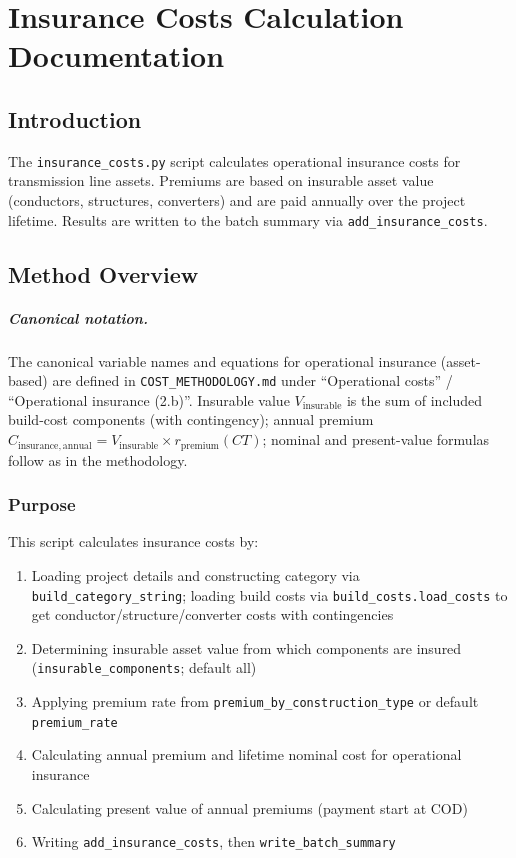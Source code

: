 \documentclass[ctcc_full_documentation.tex]{subfiles}
\begin{document}
\chapter{Insurance Costs Calculation Documentation}

\section{Introduction}

The \texttt{insurance\_costs.py} script calculates operational insurance costs for transmission line assets. Premiums are based on insurable asset value (conductors, structures, converters) and are paid annually over the project lifetime. Results are written to the batch summary via \texttt{add\_insurance\_costs}.

\section{Method Overview}

\paragraph{Canonical notation.}
The canonical variable names and equations for operational insurance (asset-based) are defined in \texttt{COST\_METHODOLOGY.md} under ``Operational costs'' / ``Operational insurance (2.b)''. Insurable value $V_{\mathrm{insurable}}$ is the sum of included build-cost components (with contingency); annual premium $C_{\mathrm{insurance,annual}} = V_{\mathrm{insurable}} \times r_{\mathrm{premium}}(CT)$; nominal and present-value formulas follow as in the methodology.

\subsection{Purpose}

This script calculates insurance costs by:
\begin{enumerate}
    \item Loading project details and constructing category via \texttt{build\_category\_string}; loading build costs via \texttt{build\_costs.load\_costs} to get conductor/structure/converter costs with contingencies
    \item Determining insurable asset value from which components are insured (\texttt{insurable\_components}; default all)
    \item Applying premium rate from \texttt{premium\_by\_construction\_type} or default \texttt{premium\_rate}
    \item Calculating annual premium and lifetime nominal cost for operational insurance
    \item Calculating present value of annual premiums (payment start at COD)
    \item Writing \texttt{add\_insurance\_costs}, then \texttt{write\_batch\_summary}
\end{enumerate}
\end{document}
